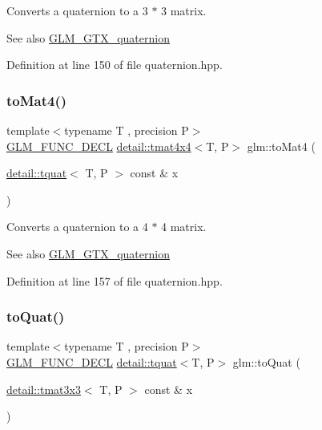 Converts a quaternion to a 3 $\ast$ 3 matrix.

\begin{DoxySeeAlso}{See also}
\hyperlink{group__gtx__quaternion}{G\+L\+M\+\_\+\+G\+T\+X\+\_\+quaternion} 
\end{DoxySeeAlso}


Definition at line 150 of file quaternion.\+hpp.

\mbox{\label{group__gtx__quaternion_ga5d441af6e45262436e73070269d8470c}} 
\subsubsection{\texorpdfstring{to\+Mat4()}{toMat4()}}
{\footnotesize\ttfamily template$<$typename T , precision P$>$ \\
\hyperlink{setup_8hpp_ab2d052de21a70539923e9bcbf6e83a51}{G\+L\+M\+\_\+\+F\+U\+N\+C\+\_\+\+D\+E\+CL} \hyperlink{structglm_1_1detail_1_1tmat4x4}{detail\+::tmat4x4}$<$T, P$>$ glm\+::to\+Mat4 (\begin{DoxyParamCaption}\item[{\hyperlink{structglm_1_1detail_1_1tquat}{detail\+::tquat}$<$ T, P $>$ const \&}]{x }\end{DoxyParamCaption})}

Converts a quaternion to a 4 $\ast$ 4 matrix.

\begin{DoxySeeAlso}{See also}
\hyperlink{group__gtx__quaternion}{G\+L\+M\+\_\+\+G\+T\+X\+\_\+quaternion} 
\end{DoxySeeAlso}


Definition at line 157 of file quaternion.\+hpp.

\mbox{\label{group__gtx__quaternion_ga7647cfc0f26055a4eea4f99a35964d7b}} 
\subsubsection{\texorpdfstring{to\+Quat()}{toQuat()}\hspace{0.1cm}{\footnotesize\ttfamily [1/2]}}
{\footnotesize\ttfamily template$<$typename T , precision P$>$ \\
\hyperlink{setup_8hpp_ab2d052de21a70539923e9bcbf6e83a51}{G\+L\+M\+\_\+\+F\+U\+N\+C\+\_\+\+D\+E\+CL} \hyperlink{structglm_1_1detail_1_1tquat}{detail\+::tquat}$<$T, P$>$ glm\+::to\+Quat (\begin{DoxyParamCaption}\item[{\hyperlink{structglm_1_1detail_1_1tmat3x3}{detail\+::tmat3x3}$<$ T, P $>$ const \&}]{x }\end{DoxyParamCaption})}

